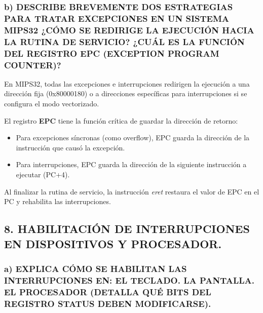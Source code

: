 \documentclass[12pt]{article}
\begin{document}
\subsubsection*{b) DESCRIBE BREVEMENTE DOS ESTRATEGIAS PARA TRATAR EXCEPCIONES EN UN SISTEMA MIPS32 ¿CÓMO SE REDIRIGE LA EJECUCIÓN HACIA LA RUTINA DE SERVICIO? ¿CUÁL ES LA FUNCIÓN DEL REGISTRO EPC (EXCEPTION PROGRAM COUNTER)?}

En MIPS32, todas las excepciones e interrupciones redirigen la ejecución a una dirección fija (0x80000180) o a direcciones específicas para interrupciones si se configura el modo vectorizado.

El registro \textbf{EPC} tiene la función crítica de guardar la dirección de retorno:
\begin{itemize}
    \item Para excepciones síncronas (como overflow), EPC guarda la dirección de la instrucción que causó la excepción.
    \item Para interrupciones, EPC guarda la dirección de la siguiente instrucción a ejecutar (PC+4).
\end{itemize}
Al finalizar la rutina de servicio, la instrucción \textit{eret} restaura el valor de EPC en el PC y rehabilita las interrupciones.

\subsection*{8. HABILITACIÓN DE INTERRUPCIONES EN DISPOSITIVOS Y PROCESADOR.}

\subsubsection*{a) EXPLICA CÓMO SE HABILITAN LAS INTERRUPCIONES EN: EL TECLADO. LA PANTALLA. EL PROCESADOR (DETALLA QUÉ BITS DEL REGISTRO STATUS DEBEN MODIFICARSE).}
\end{document}
